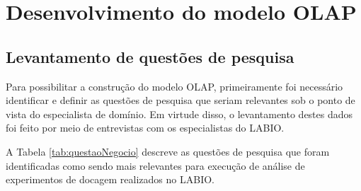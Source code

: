\renewcommand{\algorithmicfor}{\textbf{para}}
\renewcommand{\algorithmicif}{\textbf{se}}
\renewcommand{\algorithmicthen}{\textbf{então}}
\renewcommand{\algorithmicelse}{\textbf{senão}}
\renewcommand{\algorithmicendif}{\textbf{fim se}}
\renewcommand{\algorithmicendfor}{\textbf{fim para}}
\renewcommand{\algorithmicdo}{\textbf{faça}}

\chapter{Desenvolvimento do modelo OLAP}
\label{cap:DesenvolvimentoDoModeloOLAP}
\section{Levantamento de questões de pesquisa}
\label{sec:LevantamentoDeQuestoesDeNegocio}

Para possibilitar a construção do modelo OLAP, primeiramente foi necessário identificar e definir as questões de pesquisa que seriam relevantes sob o ponto de vista do especialista de domínio. Em virtude disso, o levantamento destes dados foi feito por meio de entrevistas com os especialistas do LABIO.

A Tabela \ref{tab:questaoNegocio} descreve as questões de pesquisa que foram identificadas como sendo mais relevantes para execução de análise de experimentos de docagem realizados no LABIO. 

